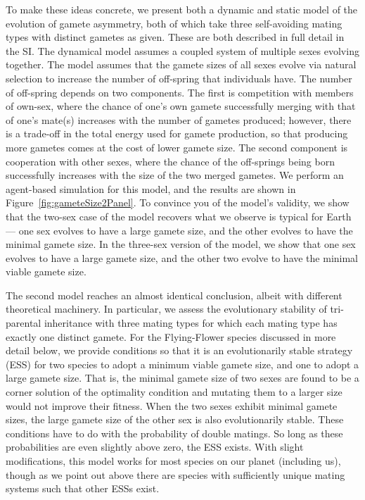 \documentclass{report}
\begin{document}
To make these ideas concrete, we present both a dynamic and static model of the evolution of gamete asymmetry, both of which take three self-avoiding mating types with distinct gametes as given. These are both described in full detail in the SI. The dynamical model assumes a coupled system of multiple sexes evolving together. The model assumes that the gamete sizes of all sexes evolve via natural selection to increase the number of off-spring that individuals have. The number of off-spring depends on two components. The first is competition with members of own-sex, where the chance of one's own gamete successfully merging with that of one's mate(s) increases with the number of gametes produced; however, there is a trade-off in the total energy used for gamete production, so that producing more gametes comes at the cost of lower gamete size. The second component is cooperation with other sexes, where the chance of the off-springs being born successfully increases with the size of the two merged gametes. We perform an agent-based simulation for this model, and the results are shown in Figure~\ref{fig:gameteSize2Panel}. To convince you of the model's validity, we show that the two-sex case of the model recovers what we observe is typical for Earth --- one sex evolves to have a large gamete size, and the other evolves to have the minimal gamete size. In the three-sex version of the model, we show that one sex evolves to have a large gamete size, and the other two evolve to have the minimal viable gamete size. 

The second model reaches an almost identical conclusion, albeit with different theoretical machinery. In particular, we assess the evolutionary stability of tri-parental inheritance with three mating types for which each mating type has exactly one distinct gamete. For the Flying-Flower species discussed in more detail below, we provide conditions so that it is an evolutionarily stable strategy (ESS) for two species to adopt a minimum viable gamete size, and one to adopt a large gamete size. That is, the minimal gamete size of two sexes are found to be a corner solution of the optimality condition and mutating them to a larger size would not improve their fitness. When the two sexes exhibit minimal gamete sizes, the large gamete size of the other sex is also evolutionarily stable. These conditions have to do with the probability of double matings. So long as these probabilities are even slightly above zero, the ESS exists. With slight modifications, this model works for most species on our planet (including us), though as we point out above there are species with sufficiently unique mating systems such that other ESSs exist.
\end{document}

